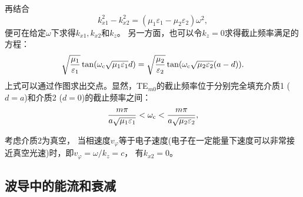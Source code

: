 再结合
\begin{equation}
    k_{x1}^2-k_{x2}^2=(\mu_1\varepsilon_1-\mu_2\varepsilon_2)\omega^2,
\end{equation}
便可在给定$\omega$下求得$k_{x1},k_{x2}$和$k_z$。
另一方面，也可以令$k_z=0$求得截止频率满足的方程：
\begin{equation}
    \sqrt{\frac{\mu_1}{\varepsilon_1}}\tan(\omega_\text c\sqrt{\mu_1\varepsilon_1}d)=
    \sqrt{\frac{\mu_2}{\varepsilon_2}}\tan(\omega_\text c\sqrt{\mu_2\varepsilon_2}(a-d)).
\end{equation}
上式可以通过作图求出交点。显然，TE$_{m0}$的截止频率位于分别完全填充介质1 ($d=a$)和介质2 ($d=0$)的截止频率之间：
\[
    \frac{m\pi}{a\sqrt{\mu_1\varepsilon_1}}<\omega_\text c<\frac{m\pi}{a\sqrt{\mu_2\varepsilon_2}},
\]

考虑介质2为真空，
当相速度$v_\varphi$等于电子速度(电子在一定能量下速度可以非常接近真空光速)时，即$v_\varphi=\omega/k_z=c$，
有$k_{x2}=0$。

\subsection{波导中的能流和衰减}

